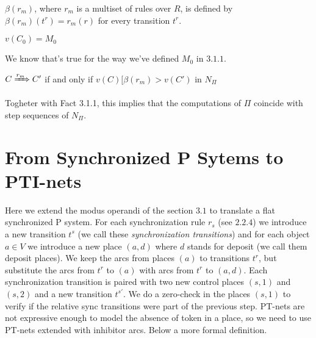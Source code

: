 \begin{definition}
$\beta(r_m)$, where $r_m$ is a multiset of rules over $R$, is defined by 
$\beta(r_m)(t^r)=r_m(r)$ for every transition $t^r$.  
\end{definition}

\begin{fact}[]
$v(C_0)=M_0$
\end{fact}
We know that's true for the way we've defined $M_0$ in \hyperref[def:def_tr_basic]{$3.1.1$}.

\begin{fact}[]
$C \xRightarrow{r_m} C'$ if and only if $v(C)[\beta(r_m)> v(C')$ in $N_\Pi$
\end{fact}

Togheter with Fact 3.1.1, this implies that the computations of $\Pi$ coincide with step sequences of $N_\Pi$. 

\section{From Synchronized P Sytems to PTI-nets}

Here we extend the modus operandi of the section \hyperref[sec:basic_p_to_pt]{$3.1$} to translate 
a flat synchronized P system.
For each synchronization rule $r_s$ (see \hyperref[def:sync_rule]{$2.2.4$}) we introduce a new transition $t^s$ (we call these \textit{synchronization transitions}) and for each object $a \in V$ we introduce a new place $(a,d)$ where $d$ stands for deposit (we call them deposit places).
We keep the arcs from places $(a)$ to transitions $t^r$, but substitute the arcs from $t^r$ to $(a)$ with arcs from $t^r$ to $(a,d)$.
Each synchronization transition is paired with two new control places $(s,1)$ and $(s,2)$ and a new transition $t^{s\prime}$.
We do a zero-check in the places $(s,1)$ to verify if the relative sync transitions were part of the previous step.
PT-nets are not expressive enough to model the absence of token in a place, so we need to use PT-nets extended with inhibitor arcs.
Below a more formal definition.

